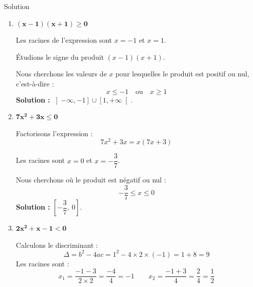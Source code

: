 \documentclass[a4paper,12pt]{article}
\begin{document}
\begin{solutionbox}{Solution}
\begin{enumerate}
    \item \(\boldsymbol{(x - 1)(x + 1) \geq 0}\)

    Les racines de l'expression sont \(x = -1\) et \(x = 1\).

    Étudions le signe du produit \((x - 1)(x + 1)\).

    \begin{center}
    \end{center}

    Nous cherchons les valeurs de \(x\) pour lesquelles le produit est positif ou nul, c'est-à-dire :
    \[
    x \leq -1 \quad \text{ou} \quad x \geq 1
    \]
    \textbf{Solution :} \( \left]-\infty, -1\right] \cup \left[1, +\infty\right[ \).

    \item \(\boldsymbol{7x^2 + 3x \leq 0}\)

    Factorisons l'expression :
    \[
    7x^2 + 3x = x(7x + 3)
    \]

    Les racines sont \(x = 0\) et \(x = -\dfrac{3}{7}\).

    \begin{center}
    \end{center}

    Nous cherchons où le produit est négatif ou nul :
    \[
    -\dfrac{3}{7} \leq x \leq 0
    \]
    \textbf{Solution :} \( \left[-\dfrac{3}{7},\ 0\right] \).

    \item \(\boldsymbol{2x^2 + x - 1 < 0}\)

    Calculons le discriminant :
    \[
    \Delta = b^2 - 4ac = 1^2 - 4 \times 2 \times (-1) = 1 + 8 = 9
    \]
    Les racines sont :
    \[
    x_1 = \dfrac{-1 - 3}{2 \times 2} = \dfrac{-4}{4} = -1 \qquad
    x_2 = \dfrac{-1 + 3}{4} = \dfrac{2}{4} = \dfrac{1}{2}
    \]


\end{enumerate}
\end{solutionbox}
\end{document}
